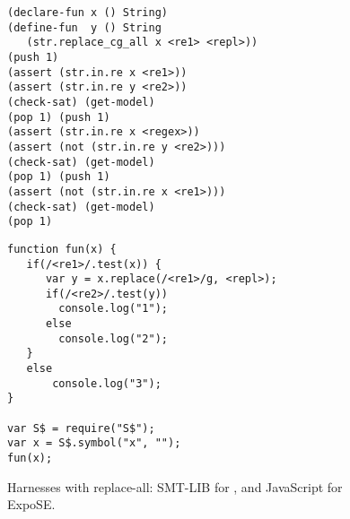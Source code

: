 \begin{figure}[tb]
  \scriptsize

  \begin{minipage}{0.49\linewidth}
\begin{verbatim}
(declare-fun x () String)
(define-fun  y () String
   (str.replace_cg_all x <re1> <repl>))
(push 1)
(assert (str.in.re x <re1>))
(assert (str.in.re y <re2>))
(check-sat) (get-model)
(pop 1) (push 1)
(assert (str.in.re x <regex>))
(assert (not (str.in.re y <re2>)))
(check-sat) (get-model)
(pop 1) (push 1)
(assert (not (str.in.re x <re1>)))
(check-sat) (get-model)
(pop 1)
\end{verbatim}
  \end{minipage}\hfill
  \raisebox{-19ex}{\rule{0.4pt}{39.5ex}}\hfill
  \begin{minipage}{0.49\linewidth}
\begin{verbatim}
function fun(x) {
   if(/<re1>/.test(x)) {
      var y = x.replace(/<re1>/g, <repl>);
      if(/<re2>/.test(y))
        console.log("1");
      else
        console.log("2");
   }
   else
       console.log("3");
}

var S$ = require("S$");
var x = S$.symbol("x", "");
fun(x);
\end{verbatim}
  \end{minipage}
  
  \caption{Harnesses with replace-all: SMT-LIB for \ostrich,
    and JavaScript for ExpoSE.}
  \label{fig:harness}
\end{figure}

